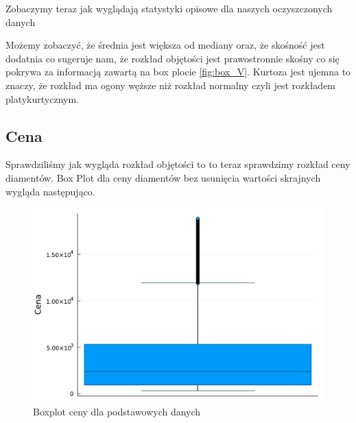 \documentclass[12pt,leqno]{article}
\theoremstyle{exer}
\begin{document}
	Zobaczymy teraz jak wyglądają statystyki opisowe dla naszych oczyszczonych danych
	
	\begin{table}[H]
		\caption{Podstawowe statystyki opisowe dla objętości}
		\label{tab:statystyki_V}
	\end{table}
	Możemy zobaczyć, że średnia jest większa  od mediany oraz, że skośność jest dodatnia co sugeruje nam, że rozkład objętości jest prawostronnie skośny co się pokrywa za informacją zawartą na box plocie \ref{fig:box_V}. Kurtoza jest ujemna to znaczy, że rozkład ma ogony węższe niż rozkład normalny czyli jest rozkładem platykurtycznym. 
	
	\subsection{Cena}
	Sprawdziliśmy jak wygląda rozkład objętości to to teraz sprawdzimy rozkład ceny diamentów.
	Box Plot dla ceny diamentów bez usunięcia wartości skrajnych wygląda następująco.
	\begin{figure}[H]
		\centering
		\includegraphics[width=4\columnwidth/5]{images/boxplot_price_danych.pdf}
		\caption{Boxplot ceny dla podstawowych danych}
		\label{fig:box_price_orginal}
	\end{figure}
	
\end{document}

